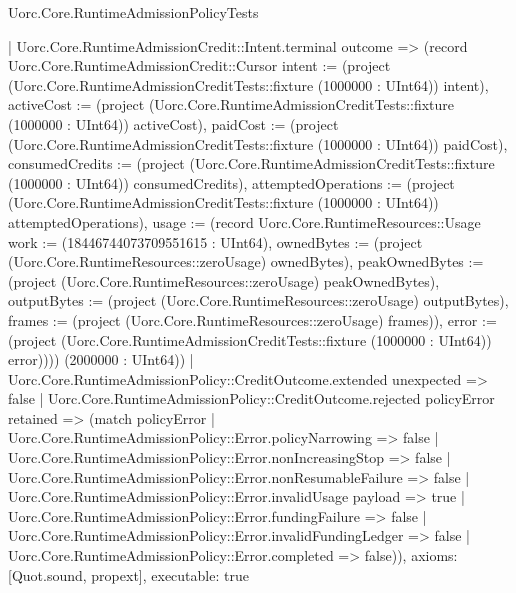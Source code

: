 \begin{lexlean}{Uorc.Core.RuntimeAdmissionPolicyTests}
\begin{semanticmodule}
{      | Uorc.Core.RuntimeAdmissionCredit::Intent.terminal outcome => (record Uorc.Core.RuntimeAdmissionCredit::Cursor {intent := (project (Uorc.Core.RuntimeAdmissionCreditTests::fixture (1000000 : UInt64)) intent), activeCost := (project (Uorc.Core.RuntimeAdmissionCreditTests::fixture (1000000 : UInt64)) activeCost), paidCost := (project (Uorc.Core.RuntimeAdmissionCreditTests::fixture (1000000 : UInt64)) paidCost), consumedCredits := (project (Uorc.Core.RuntimeAdmissionCreditTests::fixture (1000000 : UInt64)) consumedCredits), attemptedOperations := (project (Uorc.Core.RuntimeAdmissionCreditTests::fixture (1000000 : UInt64)) attemptedOperations), usage := (record Uorc.Core.RuntimeResources::Usage {work := (18446744073709551615 : UInt64), ownedBytes := (project (Uorc.Core.RuntimeResources::zeroUsage) ownedBytes), peakOwnedBytes := (project (Uorc.Core.RuntimeResources::zeroUsage) peakOwnedBytes), outputBytes := (project (Uorc.Core.RuntimeResources::zeroUsage) outputBytes), frames := (project (Uorc.Core.RuntimeResources::zeroUsage) frames)}), error := (project (Uorc.Core.RuntimeAdmissionCreditTests::fixture (1000000 : UInt64)) error)}))) (2000000 : UInt64))
    | Uorc.Core.RuntimeAdmissionPolicy::CreditOutcome.extended unexpected => false
    | Uorc.Core.RuntimeAdmissionPolicy::CreditOutcome.rejected policyError retained => (match policyError
      | Uorc.Core.RuntimeAdmissionPolicy::Error.policyNarrowing => false
      | Uorc.Core.RuntimeAdmissionPolicy::Error.nonIncreasingStop => false
      | Uorc.Core.RuntimeAdmissionPolicy::Error.nonResumableFailure => false
      | Uorc.Core.RuntimeAdmissionPolicy::Error.invalidUsage payload => true
      | Uorc.Core.RuntimeAdmissionPolicy::Error.fundingFailure => false
      | Uorc.Core.RuntimeAdmissionPolicy::Error.invalidFundingLedger => false
      | Uorc.Core.RuntimeAdmissionPolicy::Error.completed => false)),
  axioms: [Quot.sound, propext],
  executable: true
}


\end{semanticmodule}
\end{lexlean}
